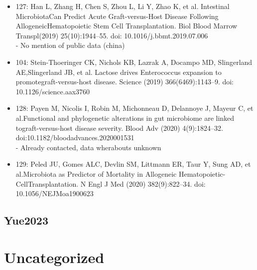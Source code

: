 \documentclass[11pt,a4paper]{article}
\begin{document}
\begin{itemize}
    - No mention of public data (china)
    \item 127: Han L, Zhang H, Chen S, Zhou L, Li Y, Zhao K, et al. Intestinal MicrobiotaCan Predict Acute Graft-versus-Host Disease Following AllogeneicHematopoietic Stem Cell Transplantation. Biol Blood Marrow Transpl(2019) 25(10):1944–55. doi: 10.1016/j.bbmt.2019.07.006\\
    - No mention of public data (china)
    \item 104: Stein-Thoeringer CK, Nichols KB, Lazrak A, Docampo MD, Slingerland AE,Slingerland JB, et al. Lactose drives Enterococcus expansion to promotegraft-versus-host disease. Science (2019) 366(6469):1143–9. doi: 10.1126/science.aax3760
    \item 128: Payen M, Nicolis I, Robin M, Michonneau D, Delannoye J, Mayeur C, et al.Functional and phylogenetic alterations in gut microbiome are linked tograft-versus-host disease severity. Blood Adv (2020) 4(9):1824–32. doi:10.1182/bloodadvances.2020001531\\
    - Already contacted, data wherabouts unknown
    \item 129: Peled JU, Gomes ALC, Devlin SM, Littmann ER, Taur Y, Sung AD, et al.Microbiota as Predictor of Mortality in Allogeneic Hematopoietic-CellTransplantation. N Engl J Med (2020) 382(9):822–34. doi: 10.1056/NEJMoa1900623
\end{itemize}

\subsection{Yue2023}

%
\section{Uncategorized}
\label{sec:uncat}
\end{document}

